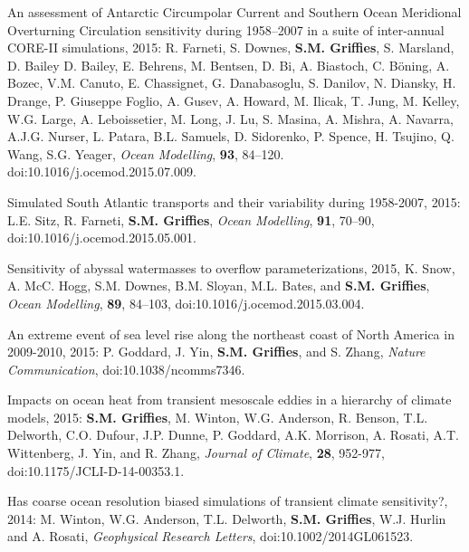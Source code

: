 \begin{etaremune}

\item An assessment of Antarctic Circumpolar Current and Southern
  Ocean Meridional Overturning Circulation sensitivity during
  1958--2007 in a suite of inter-annual CORE-II simulations, 2015:
  R. Farneti, S. Downes, {\bf S.M. Grif\/f\/ies}, S. Marsland,
  D. Bailey D. Bailey, E. Behrens, M. Bentsen, D. Bi, A. Biastoch,
  C. B\"oning, A. Bozec, V.M. Canuto, E. Chassignet, G. Danabasoglu,
  S. Danilov, N. Diansky, H. Drange, P. Giuseppe Foglio, A. Gusev,
  A. Howard, M. Ilicak, T.  Jung, M. Kelley, W.G. Large,
  A. Leboissetier, M. Long, J. Lu, S. Masina, A. Mishra, A. Navarra,
  A.J.G. Nurser, L. Patara, B.L. Samuels, D. Sidorenko, P. Spence,
  H. Tsujino, Q. Wang, S.G. Yeager, {\it Ocean Modelling}, {\bf 93},
  84--120. doi:10.1016/j.ocemod.2015.07.009.

\item Simulated South Atlantic transports and their variability during
  1958-2007, 2015: L.E.  Sitz, R. Farneti, {\bf S.M. Grif\/f\/ies},
  {\it Ocean Modelling}, {\bf 91}, 70--90,
  doi:10.1016/j.ocemod.2015.05.001.

\item Sensitivity of abyssal watermasses to overflow
  parameterizations, 2015, K. Snow, A. McC. Hogg, S.M. Downes,
  B.M. Sloyan, M.L. Bates, and {\bf S.M. Grif\/f\/ies}, {\it Ocean
    Modelling}, {\bf 89}, 84--103,
  doi:10.1016/j.ocemod.2015.03.004.

\item An extreme event of sea level rise along the northeast coast of
  North America in 2009-2010, 2015: P.  Goddard, J. Yin, {\bf
    S.M. Grif\/f\/ies}, and S. Zhang, {\it Nature Communication}, doi:10.1038/ncomms7346.

\item Impacts on ocean heat from transient mesoscale eddies in a
  hierarchy of climate models, 2015: {\bf S.M. Grif\/f\/ies},
  M. Winton, W.G. Anderson, R. Benson, T.L. Delworth, C.O. Dufour,
  J.P. Dunne, P. Goddard, A.K. Morrison, A. Rosati, A.T. Wittenberg,
  J. Yin, and R. Zhang, {\it Journal of Climate}, {\bf 28}, 952-977,
  doi:10.1175/JCLI-D-14-00353.1.

\item Has coarse ocean resolution biased simulations of transient
  climate sensitivity?, 2014: M.  Winton, W.G. Anderson,
  T.L. Delworth, {\bf S.M. Grif\/f\/ies}, W.J. Hurlin and A. Rosati,
  {\it Geophysical Research Letters}, doi:10.1002/2014GL061523.


\end{etaremune}
